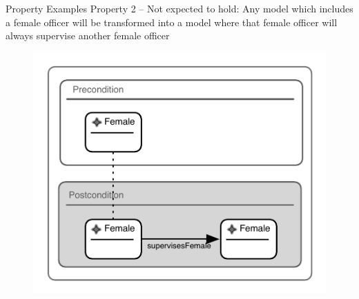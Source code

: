 \documentclass[xcolor=dvipsnames, 14pt]{beamer}
\begin{document}
\begin{frame}{Property Examples}
Property 2 -- Not expected to hold: \small Any model which includes a female officer will
be transformed into a model where that female officer will always supervise another
female officer
\normalsize

\begin{figure}[htb]
        \centering
                \centering
                \includegraphics[height=.7\textheight]{../figures/policestation_dsltrans/unsatisfied.pdf}
                \label{fig:dsltrans_prop1}

\end{figure}
\end{frame}
\end{document}
